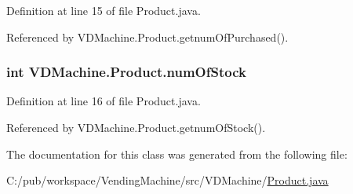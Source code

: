 Definition at line 15 of file Product.\+java.



Referenced by V\+D\+Machine.\+Product.\+getnum\+Of\+Purchased().

\subsubsection[{\texorpdfstring{num\+Of\+Stock}{numOfStock}}]{\setlength{\rightskip}{0pt plus 5cm}int V\+D\+Machine.\+Product.\+num\+Of\+Stock\hspace{0.3cm}{\ttfamily [private]}}\hypertarget{class_v_d_machine_1_1_product_a8cb19a2414b353b0d928ad35e7dde1ee}{}\label{class_v_d_machine_1_1_product_a8cb19a2414b353b0d928ad35e7dde1ee}


Definition at line 16 of file Product.\+java.



Referenced by V\+D\+Machine.\+Product.\+getnum\+Of\+Stock().



The documentation for this class was generated from the following file\+:\begin{DoxyCompactItemize}
\item 
C\+:/pub/workspace/\+Vending\+Machine/src/\+V\+D\+Machine/\hyperlink{_product_8java}{Product.\+java}\end{DoxyCompactItemize}
